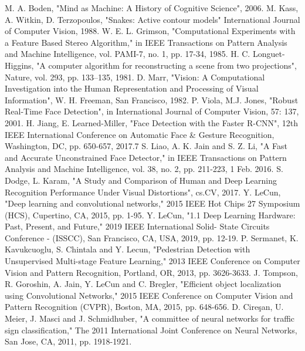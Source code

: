 \documentclass[12pt,a4paper,twoside]{report}
\begin{document}
\begin{thebibliography}{1}
M. A. Boden, "Mind as Machine: A History of Cognitive Science", 2006.
M. Kass, A. Witkin, D. Terzopoulos, "Snakes: Active contour models" International Journal of Computer Vision, 1988.
W. E. L. Grimson, "Computational Experiments with a Feature Based Stereo Algorithm," in IEEE Transactions on Pattern Analysis and Machine Intelligence, vol. PAMI-7, no. 1, pp. 17-34, 1985.
H. C. Longuet-Higgins, "A computer algorithm for reconstructing a scene from two projections", Nature, vol. 293, pp. 133–135, 1981. 
D. Marr, "Vision: A Computational Investigation into the Human Representation
and Processing of Visual Information", W. H. Freeman, San Francisco, 1982.
P. Viola, M.J. Jones, "Robust Real-Time Face Detection", in International Journal of Computer Vision, 57: 137, 2001.
H. Jiang, E. Learned-Miller, "Face Detection with the Faster R-CNN", 12th IEEE International Conference on Automatic Face \& Gesture Recognition, Washington, DC, pp. 650-657, 2017.7
S. Liao, A. K. Jain and S. Z. Li, "A Fast and Accurate Unconstrained Face Detector," in IEEE Transactions on Pattern Analysis and Machine Intelligence, vol. 38, no. 2, pp. 211-223, 1 Feb. 2016.
S. Dodge, L. Karam, "A Study and Comparison of Human and Deep Learning Recognition Performance
Under Visual Distortions", cs.CV, 2017.
Y. LeCun, "Deep learning and convolutional networks," 2015 IEEE Hot Chips 27 Symposium (HCS), Cupertino, CA, 2015, pp. 1-95.
Y. LeCun, "1.1 Deep Learning Hardware: Past, Present, and Future," 2019 IEEE International Solid- State Circuits Conference - (ISSCC), San Francisco, CA, USA, 2019, pp. 12-19.
P. Sermanet, K. Kavukcuoglu, S. Chintala and Y. Lecun, "Pedestrian Detection with Unsupervised Multi-stage Feature Learning," 2013 IEEE Conference on Computer Vision and Pattern Recognition, Portland, OR, 2013, pp. 3626-3633.
J. Tompson, R. Goroshin, A. Jain, Y. LeCun and C. Bregler, "Efficient object localization using Convolutional Networks," 2015 IEEE Conference on Computer Vision and Pattern Recognition (CVPR), Boston, MA, 2015, pp. 648-656.
D. Cireşan, U. Meier, J. Masci and J. Schmidhuber, "A committee of neural networks for traffic sign classification," The 2011 International Joint Conference on Neural Networks, San Jose, CA, 2011, pp. 1918-1921.

\end{thebibliography}
\end{document}
